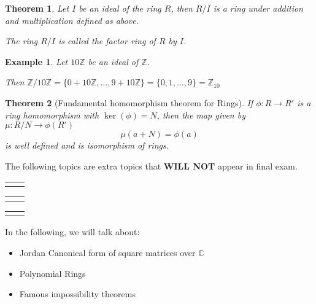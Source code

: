 \documentclass{article}
\theoremstyle{MyNonumberplain}
\theoremstyle{break}
\newcommand{\nline}{\begin{tabular}{ll}&\\\end{tabular}}
\theoremstyle{break}
\newtheorem{theorem}{Theorem}[section]
\newtheorem{example}{Example}[section]
\theoremstyle{break}
\theoremstyle{definition}
\theoremstyle{break}
\begin{document}
\begin{thmbox}
    \begin{theorem}
        Let $I$ be an ideal of the ring $R$, then $R / I$ is a ring under addition and
        multiplication defined as above.\bigskip
        
        The ring $R / I$ is called the factor ring of $R$ by $I$. 
    \end{theorem}

\end{thmbox}


\begin{expbox}
    \begin{example}
        Let $10\mathbb{Z}$ be an ideal of $\mathbb{Z}$.\bigskip

        Then $\mathbb{Z}/ 10\mathbb{Z}= \{ 0 + 10\mathbb{Z}, \ldots, 9 + 10\mathbb{Z}
        \} = \{ 0, 1, \ldots, 9 \} =\mathbb{Z}_{10}$
    \end{example}
\end{expbox}

\begin{thmbox}
    \begin{theorem}[Fundamental homomorphism theorem for Rings]
        If $\phi : R \rightarrow R'$ is a ring homomorphism with $\ker (\phi) = N$,
        then the map given by $\mu : R / N \rightarrow \phi (R')$
        \[ \mu (a + N) = \phi (a) \]
        is well defined and is isomorphism of rings. 
    \end{theorem}
\end{thmbox}

\newpage


\begin{center}
    \vspace*{\fill}
        The following topics are extra topics that \textbf{WILL NOT} appear in final exam.

        \nline
        \nline
        \nline

        In the following, we will talk about:
        \begin{itemize}
        \item Jordan Canonical form of square matrices over $\mathbb{C}$

        \item Polynomial Rings

        \item Famous impossibility theorems
        \end{itemize}
    \vspace*{\fill}
\end{center}
\end{document}
